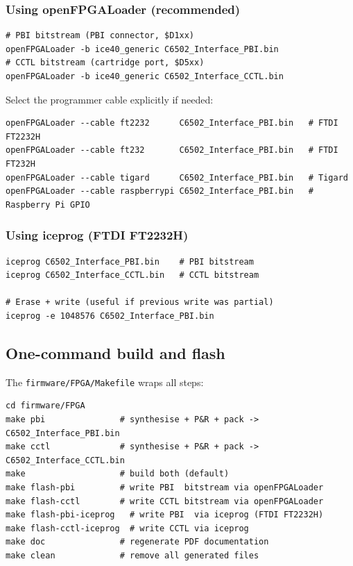 \documentclass[11pt,a4paper]{article}
\newcommand{\file}[1]{\texttt{#1}}
\begin{document}
\subsubsection{Using openFPGALoader (recommended)}

\begin{lstlisting}[style=shell,caption={Program with openFPGALoader}]
# PBI bitstream (PBI connector, $D1xx)
openFPGALoader -b ice40_generic C6502_Interface_PBI.bin
# CCTL bitstream (cartridge port, $D5xx)
openFPGALoader -b ice40_generic C6502_Interface_CCTL.bin
\end{lstlisting}

Select the programmer cable explicitly if needed:

\begin{lstlisting}[style=shell]
openFPGALoader --cable ft2232      C6502_Interface_PBI.bin   # FTDI FT2232H
openFPGALoader --cable ft232       C6502_Interface_PBI.bin   # FTDI FT232H
openFPGALoader --cable tigard      C6502_Interface_PBI.bin   # Tigard
openFPGALoader --cable raspberrypi C6502_Interface_PBI.bin   # Raspberry Pi GPIO
\end{lstlisting}

\subsubsection{Using iceprog (FTDI FT2232H)}

\begin{lstlisting}[style=shell,caption={Program with iceprog}]
iceprog C6502_Interface_PBI.bin    # PBI bitstream
iceprog C6502_Interface_CCTL.bin   # CCTL bitstream

# Erase + write (useful if previous write was partial)
iceprog -e 1048576 C6502_Interface_PBI.bin
\end{lstlisting}

\subsection{One-command build and flash}

The \file{firmware/FPGA/Makefile} wraps all steps:

\begin{lstlisting}[style=shell]
cd firmware/FPGA
make pbi               # synthesise + P&R + pack -> C6502_Interface_PBI.bin
make cctl              # synthesise + P&R + pack -> C6502_Interface_CCTL.bin
make                   # build both (default)
make flash-pbi         # write PBI  bitstream via openFPGALoader
make flash-cctl        # write CCTL bitstream via openFPGALoader
make flash-pbi-iceprog   # write PBI  via iceprog (FTDI FT2232H)
make flash-cctl-iceprog  # write CCTL via iceprog
make doc               # regenerate PDF documentation
make clean             # remove all generated files
\end{lstlisting}
\end{document}
